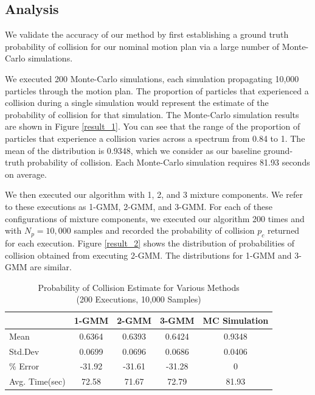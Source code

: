 \documentclass[journal]{IEEEtran}
\begin{document}
\subsection{Analysis}
We validate the accuracy of our method by first establishing a ground truth probability of collision for our nominal motion plan via a large number of Monte-Carlo simulations.

We executed 200 Monte-Carlo simulations, each simulation propagating 10,000 particles through the motion plan. The proportion of particles that experienced a collision during a single simulation would represent the estimate of the probability of collision for that simulation. The Monte-Carlo simulation results are shown in Figure \ref{result_1}. You can see that the range of the proportion of particles that experience a collision varies across a spectrum from 0.84 to 1. The mean of the distribution is 0.9348, which we consider as our baseline ground-truth probability of collision. Each Monte-Carlo simulation requires 81.93 seconds on average.

We then executed our algorithm with 1, 2, and 3 mixture components. We refer to these executions as 1-GMM, 2-GMM, and 3-GMM. For each of these configurations of mixture components, we executed our algorithm 200 times and with $N_p=10,000$ samples and recorded the probability of collision $p_c$ returned for each execution. Figure \ref{result_2} shows the distribution of probabilities of collision obtained from executing 2-GMM. The distributions for 1-GMM and 3-GMM are similar.

\begin{table}[h!]
  \begin{center}
    \caption{Probability of Collision Estimate for Various Methods\\(200 Executions, 10,000 Samples)}
    \label{tab:table1}
    \begin{tabular}{l|c|c|c|c} %
      \textbf{} & \textbf{1-GMM} & \textbf{2-GMM} & \textbf{3-GMM} & \textbf{MC Simulation}\\
      \hline
      Mean & 0.6364 & 0.6393 & 0.6424 & 0.9348\\
      Std.Dev & 0.0699 & 0.0696 & 0.0686 & 0.0406\\
      \% Error & -31.92 & -31.61 & -31.28 & 0\\
      Avg. Time(sec) & 72.58 & 71.67 & 72.79 & 81.93\\      
    \end{tabular}
  \end{center}
\end{table}
\end{document}
